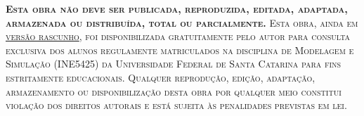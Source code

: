 \textsc{\textbf{Esta obra não deve ser publicada, reproduzida, editada, adaptada, armazenada ou distribuída, total ou parcialmente.}} \textsc{Esta obra, ainda em \underline{versão rascunho}, foi disponibilizada gratuitamente pelo autor para consulta exclusiva dos alunos regulamente matriculados na disciplina de Modelagem e Simulação (INE5425) da Universidade Federal de Santa Catarina para fins estritamente educacionais.} \textsc{Qualquer reprodução, edição, adaptação, armazenamento ou disponibilização desta obra por qualquer meio constitui violação dos direitos autorais e está sujeita às penalidades previstas em lei.}

\noindent \textit{\\\datalonga} %
